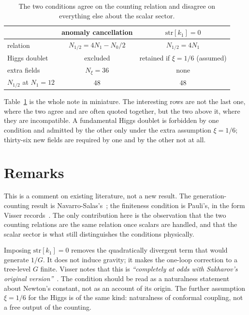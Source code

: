\documentclass[aps,prd,twocolumn,superscriptaddress,nofootinbib,10pt]{revtex4-2}
\begin{document}
\begin{table}[t]
\caption{The two conditions agree on the counting relation and disagree on everything else about
the scalar sector.}
\label{tab:compare}
\begin{ruledtabular}
\begin{tabular}{lcc}
 & anomaly cancellation & $\mathrm{str}[k_1] = 0$ \\
\hline
relation            & $N_{1/2} = 4N_1 - N_0/2$ & $N_{1/2} = 4N_1$ \\
Higgs doublet       & excluded                 & retained if $\xi = 1/6$ (assumed) \\
extra fields        & $N_\xi = 36$             & none \\
$N_{1/2}$ at $N_1 = 12$ & 48                   & 48 \\
\end{tabular}
\end{ruledtabular}
\end{table}

Table~\ref{tab:compare} is the whole note in miniature. The interesting rows are not the last one,
where the two agree and are often quoted together, but the two above it, where they are
incompatible. A fundamental Higgs doublet is forbidden by one condition and admitted by the other only under
the extra assumption $\xi = 1/6$; thirty-six new fields are required by one and by the other not
at all.

\section{Remarks}\label{sec:remarks}

This is a comment on existing literature, not a new result. The generation-counting result is
Navarro-Salas's~\cite{NavarroSalas2024}; the finiteness condition is Pauli's, in the form Visser
records~\cite{Visser2002}. The only contribution here is the observation that the two counting
relations are the same relation once scalars are handled, and that the scalar sector is what
still distinguishes the conditions physically.

Imposing $\mathrm{str}[k_1] = 0$ removes the quadratically divergent term that would generate
$1/G$. It does not induce gravity; it makes the one-loop correction to a tree-level $G$ finite.
Visser notes that this is \emph{``completely at odds with Sakharov's original
version''}~\cite{Visser2002}. The condition should be read as a naturalness statement about Newton's
constant, not as an account of its origin. The further assumption $\xi = 1/6$ for the Higgs is of
the same kind: naturalness of conformal coupling, not a free output of the counting.
\end{document}
